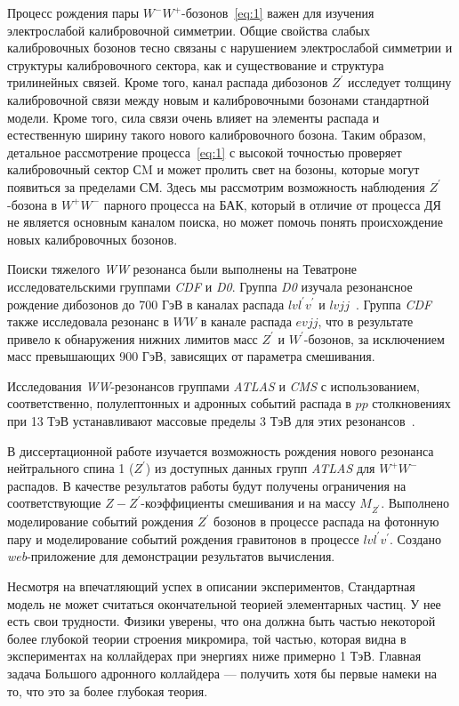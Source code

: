 Процесс рождения пары $W^-W^+$-бозонов~\ref{eq:1} важен для изучения электрослабой калибровочной симметрии. Общие свойства слабых калибровочных бозонов тесно связаны с нарушением электрослабой симметрии и структуры калибровочного сектора, как и существование и структура трилинейных связей. Кроме того, канал распада дибозонов $Z^\prime$ исследует толщину калибровочной связи между новым и калибровочными бозонами стандартной модели. Кроме того, сила связи очень влияет на элементы распада и естественную ширину такого нового калибровочного бозона. Таким образом, детальное рассмотрение процесса~\ref{eq:1} с высокой точностью проверяет калибровочный сектор СM и может пролить свет на бозоны, которые могут появиться за пределами СМ. Здесь мы рассмотрим возможность наблюдения $Z^\prime$-бозона в $W^+W^-$ парного процесса на БАК, который в отличие от процесса ДЯ не является основным каналом поиска, но может помочь понять происхождение новых калибровочных бозонов.

Поиски тяжелого \textit{WW} резонанса были выполнены на Теватроне исследовательскими группами \textit{CDF} и \textit{D0}. Группа \textit{D0} изучала резонансное рождение дибозонов до 700 ГэВ в каналах распада $lvl^\prime v^\prime$ и $lvjj$~\cite{Krasnikov:2004}. Группа \textit{CDF} также исследовала резонанс в $WW$ в канале распада $evjj$, что в результате привело к обнаружения нижних лимитов масс $Z^\prime$
и $W^\prime$-бозонов, за исключением масс превышающих 900 ГэВ, зависящих от параметра смешивания.

Исследования \textit{WW}-резонансов группами \textit{ATLAS} и \textit{CMS} с использованием, соответственно, полулептонных и адронных событий распада в $pp$ столкновениях при 13 ТэВ устанавливают массовые пределы 3 ТэВ для этих резонансов~\cite{nuclphys:weak}. 

В диссертационной работе изучается возможность рождения нового резонанса нейтрального спина 1 ($Z^\prime$) из доступных данных групп \textit{ATLAS} для $W^+W^-$ распадов. В качестве результатов работы будут получены ограничения на соответствующие $Z-Z^\prime$-коэффициенты смешивания и на массу $M_{Z^\prime}$.
Выполнено моделирование событий рождения $Z^\prime$ бозонов в процессе распада на фотонную пару и моделирование событий рождения гравитонов в процессе $lvl^\prime v^\prime$. Создано \textit{web}-приложение для демонстрации результатов вычисления.

Несмотря на впечатляющий успех в описании экспериментов, Стандартная модель не может считаться окончательной теорией элементарных частиц. У нее есть свои трудности. Физики уверены, что она должна быть частью некоторой более глубокой теории строения микромира, той частью, которая видна в экспериментах на коллайдерах при энергиях ниже примерно 1 ТэВ. Главная задача Большого адронного коллайдера — получить хотя бы первые намеки на то, что это за более глубокая теория.

